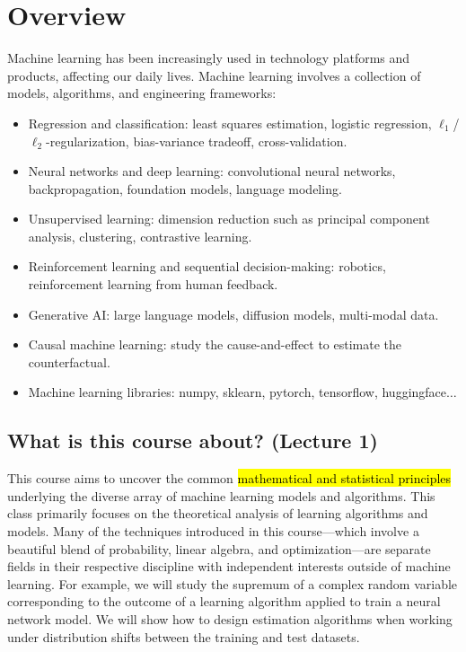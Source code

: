 \section{Overview}

Machine learning has been increasingly used in technology platforms and products, affecting our daily lives. %
Machine learning involves a collection of models, algorithms, and engineering frameworks:
\begin{itemize}
    \item Regression and classification: least squares estimation, logistic regression, $\ell_1$/$\ell_2$-regularization, bias-variance tradeoff, cross-validation.
    \item Neural networks and deep learning: convolutional neural networks, backpropagation, foundation models, language modeling.
    \item Unsupervised learning: dimension reduction such as principal component analysis, clustering, contrastive learning.
    \item Reinforcement learning and sequential decision-making: robotics, reinforcement learning from human feedback.
    \item Generative AI: large language models, diffusion models, multi-modal data.
    \item Causal machine learning: study the cause-and-effect to estimate the counterfactual.
    \item Machine learning libraries: numpy, sklearn, pytorch, tensorflow, huggingface$\dots$
\end{itemize}

\subsection{What is this course about? (Lecture 1)}

This course aims to uncover the common \hl{mathematical and statistical principles} underlying the diverse array of machine learning models and algorithms.
This class primarily focuses on the theoretical analysis of learning algorithms and models. Many of the techniques introduced in this course---which involve a beautiful blend of probability, linear algebra, and optimization---are separate fields in their respective discipline with independent interests outside of machine learning.
For example, we will study the supremum of a complex random variable corresponding to the outcome of a learning algorithm applied to train a neural network model.
We will show how to design estimation algorithms when working under distribution shifts between the training and test datasets.

